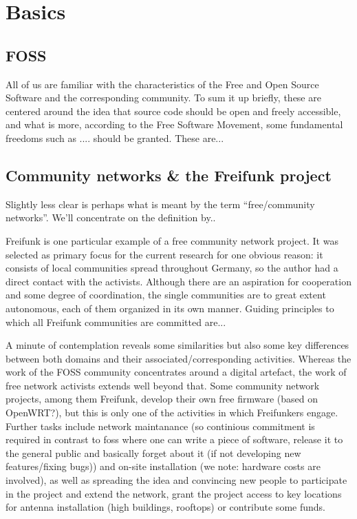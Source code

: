 \section{Basics}
\subsection{FOSS}
All of us are familiar with the characteristics of the Free and Open Source Software and the corresponding community.
To sum it up briefly, these are centered around the idea that source code should be open and freely accessible, and what is more, according to the Free Software Movement, some fundamental freedoms such as .... should be granted.
These are...


\subsection{Community networks \& the Freifunk project}
Slightly less clear is perhaps what is meant by the term ``free/community networks''. %
We'll concentrate on the definition by..

Freifunk is one particular example of a free community network project.
It was selected as primary focus for the current research for one obvious reason: it consists of local communities spread throughout Germany, so the author had a direct contact with the activists.
Although there are an aspiration for cooperation and some degree of coordination, the single communities are to great extent autonomous, each of them organized in its own manner.
Guiding principles to which all Freifunk communities are committed are...

A minute of contemplation reveals some similarities but also some key differences between both domains and their associated/corresponding activities.
Whereas the work of the FOSS community concentrates around a digital artefact, the work of free network activists extends well beyond that.
Some community network projects, among them Freifunk, develop their own free firmware (based on OpenWRT?), but this is only one of the activities in which Freifunkers engage.
Further tasks include network maintanance (so continious commitment is required in contrast to foss where one can write a piece of software, release it to the general public and basically forget about it (if not developing new features/fixing bugs)) and on-site installation (we note: hardware costs are involved), as well as spreading the idea and convincing new people to participate in the project and extend the network, grant the project access to key locations for antenna installation (high buildings, rooftops) or contribute some funds.

